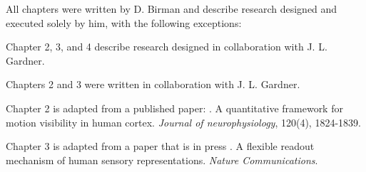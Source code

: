 All chapters were written by D. Birman and describe research designed and executed solely by him, with the following exceptions:

Chapter 2, 3, and 4 describe research designed in collaboration with J. L. Gardner. 

Chapters 2 and 3 were written in collaboration with J. L. Gardner. 

Chapter 2 is adapted from a published paper: \citet{Birman2018-sp}. A quantitative framework for motion visibility in human cortex. \textit{Journal of neurophysiology}, 120(4), 1824-1839.

Chapter 3 is adapted from a paper that is in press \citet{Birman_undated-vk}. A flexible readout mechanism of human sensory representations. \textit{Nature Communications}. 